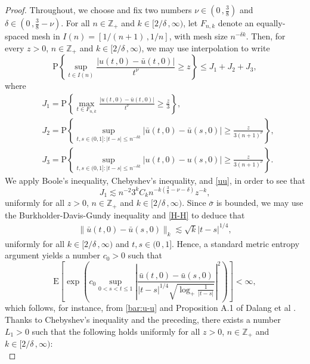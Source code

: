 \documentclass[reqno]{amsart}
\newcommand{\<}{\langle}
\renewcommand{\>}{\rangle}
\newcommand{\Z}{\mathbb{Z}}
\renewcommand{\P}{\mathrm{P}}
\newcommand{\E}{\mathrm{E}}
\newcommand{\1}{\mathbb{1}}
\renewcommand{\ge}{\geqslant}
\renewcommand{\le}{\leqslant}
\theoremstyle{definition}
\numberwithin{equation}{section}
\begin{document}
\begin{proof}
	Throughout, we choose and fix two numbers 
	$\nu\in (0\,,\frac38)$
	and $\delta \in (0\,,\frac38-\nu)$.
	For all $n \in \Z_+$ and $k \in [2/\delta\,,\infty)$, let $F_{n,k}$ 
	denote an equally-spaced mesh in $I(n) = [1/(n+1)\,,1/n]$,
	with mesh size $n^{-\delta k}$.
	Then, for every $z > 0$, $n \in \Z_+$ and $k \in [2/\delta\,,\infty)$, 
	we may use interpolation to write
	\begin{equation}\label{j123}
		\P\left\{ \sup_{t \in I(n)}
		\frac{|u(t\,,0)-\bar{u}(t\,,0)|}{t^\nu} \ge z \right\} \le J_1 + J_2 + J_3,
	\end{equation}
	where
	\begin{align*}
		&J_1 = \P\left\{ \max_{t\in F_{n,k}} 
			\frac{|u(t\,,0)-\bar{u}(t\,,0)|}{t^\nu} \ge \frac z3 \right\},\\
		&J_2 = \P\left\{ \sup_{t,s\in(0,1]: |t-s| \le n^{-\delta k}} 
			|\bar{u}(t\,,0)-\bar{u}(s\,,0)| \ge \frac{ z}{3(n+1)^\nu} \right\},\\
		&J_3 = \P\left\{ \sup_{t,s\in(0,1]: |t-s| \le n^{-\delta k}} 
			|u(t\,,0)-u(s\,,0)| \ge \frac{z}{3(n+1)^\nu} \right\}.
	\end{align*}
	We apply Boole's inequality, Chebyshev's inequality, and \eqref{uu}, in order to see that
	\begin{equation}\label{J1}
		J_1 \lesssim n^{-2} 3^k C_k n^{-k(\frac38-\nu-\delta)} z^{-k},
	\end{equation}
	uniformly for all $z>0$, $n \in \Z_+$ and $k \in [2/\delta\,,\infty)$.
	Since $\bar{\sigma}$ is bounded, we may use the 
	Burkholder-Davis-Gundy inequality \cite[Proposition 5.2]{CBMS}
	and \eqref{H-H} to deduce that
	\begin{align}\label{bar:u-u}
		\|\bar{u}(t\,,0)-\bar{u}(s\,,0)\|_k \lesssim \sqrt k |t-s|^{1/4},
	\end{align}
	uniformly for all $k \in [2/\delta\,,\infty)$ and $t,s \in (0\,,1]$.
	Hence, a standard metric entropy argument yields a number $c_0>0$ such that
	\[
		\E\left[ \exp\left( c_0 \sup_{0 < s < t \le 1} 
		\left|\frac{\bar{u}(t\,,0)-\bar{u}(s\,,0)}{|t-s|^{1/4}
		\sqrt{\log_+\frac{1}{|t-s|}}}\right|^2 \right) \right] < \infty,
	\]
	which follows, for instance, from \eqref{bar:u-u} and Proposition A.1 of 
	Dalang et al \cite{DKN07}.
	Thanks to Chebyshev's inequality and the preceding, there
	exists a number $L_1>0$ such that the following holds uniformly
	for all $z>0$, $n \in \Z_+$ and $k \in [2/\delta\,,\infty)$:
	\begin{equation}\label{J2}

\end{equation}
\end{proof}
\end{document}
